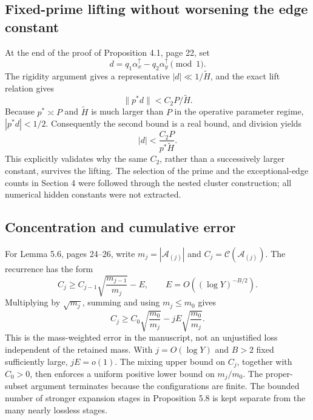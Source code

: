 \documentclass[10pt]{article}
\begin{document}
\subsection*{Fixed-prime lifting without worsening the edge constant}
At the end of the proof of Proposition 4.1, page 22, set \[d=q_1\alpha_x^\uparrow-q_2\alpha_y^\uparrow\pmod1 .\] The rigidity argument gives a representative \(|d|\ll1/\widetilde H\), and the exact lift relation gives \[\|p^\ast d\|<C_2P/\widetilde H .\] Because \(p^\ast\asymp P\) and \(\widetilde H\) is much larger than \(P\) in the operative parameter regime, \(|p^\ast d|<1/2\). Consequently the second bound is a real bound, and division yields \[|d|<\frac{C_2P}{p^\ast\widetilde H}.\] This explicitly validates why the same \(C_2\), rather than a successively larger constant, survives the lifting. The selection of the prime and the exceptional-edge counts in Section 4 were followed through the nested cluster construction; all numerical hidden constants were not extracted.\par
\subsection*{Concentration and cumulative error}
For Lemma 5.6, pages 24–26, write \(m_j=|\mathcal A_{(j)}|\) and \(C_j=\mathcal C(\mathcal A_{(j)})\). The recurrence has the form \[C_j\ge C_{j-1}\sqrt{\frac{m_{j-1}}{m_j}}-E,
 \qquad E=O((\log Y)^{-B/2}).\] Multiplying by \(\sqrt{m_j}\), summing and using \(m_j\le m_0\) gives \[C_j\ge C_0\sqrt{\frac{m_0}{m_j}}
          -jE\sqrt{\frac{m_0}{m_j}}.\] This is the mass-weighted error in the manuscript, not an unjustified loss independent of the retained mass. With \(j=O(\log Y)\) and \(B>2\) fixed sufficiently large, \(jE=o(1)\). The mixing upper bound on \(C_j\), together with \(C_0>0\), then enforces a uniform positive lower bound on \(m_j/m_0\). The proper-subset argument terminates because the configurations are finite. The bounded number of stronger expansion stages in Proposition 5.8 is kept separate from the many nearly lossless stages.\par
\end{document}
